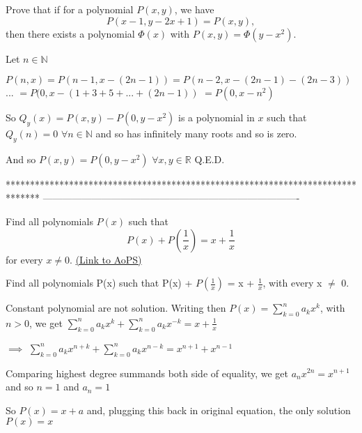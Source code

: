 \begin{solution}
	\begin{tcolorbox}Prove that if for a polynomial $P(x, y)$, we have
\[P(x - 1, y - 2x + 1) = P(x, y),\]
then there exists a polynomial $\Phi(x)$ with $P(x, y) = \Phi(y - x^2).$\end{tcolorbox}
Let $n\in\mathbb N$

$P(n,x)=P(n-1,x-(2n-1))=P(n-2,x-(2n-1)-(2n-3))$ ... $=P(0,x-(1+3+5+...+(2n-1))$ $=P(0,x-n^2)$

So $Q_y(x)=P(x,y)-P(0,y-x^2)$ is a polynomial in $x$ such that $Q_y(n)=0$ $\forall n\in\mathbb N$ and so has infinitely many roots and so is zero.

And so $P(x,y)=P(0,y-x^2)$ $\forall x,y\in\mathbb R$
Q.E.D.
\end{solution}
*******************************************************************************
-------------------------------------------------------------------------------

\begin{problem}
	Find all polynomials $P(x)$ such that \[P(x) + P\left (\frac{1}{x}\right) = x + \frac {1}{x}\] for every $x \neq 0$.
	\flushright \href{https://artofproblemsolving.com/community/c6h389129}{(Link to AoPS)}
\end{problem}



\begin{solution}
	\begin{tcolorbox}Find all polynomials P(x) such that P(x) + $P(\frac{1}{x})$ = x + $\frac {1}{x}$, with every x $\neq$ 0.\end{tcolorbox}
Constant polynomial are not solution. Writing then $P(x)=\sum_{k=0}^na_kx^k$, with $n>0$, we get $\sum_{k=0}^na_kx^k+\sum_{k=0}^na_kx^{-k}=x+\frac 1x$

$\implies$ $\sum_{k=0}^na_kx^{n+k}+\sum_{k=0}^na_kx^{n-k}=x^{n+1}+x^{n-1}$

Comparing highest degree summands both side of equality, we get $a_nx^{2n}=x^{n+1}$ and so $n=1$ and $a_n=1$

So $P(x)=x+a$ and, plugging this back in original equation, the only solution $\boxed{P(x)=x}$
\end{solution}



